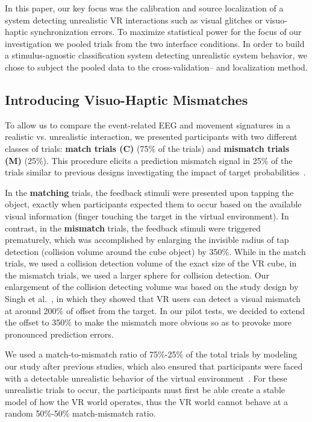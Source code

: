In this paper, our key focus was the calibration and source localization of a system detecting unrealistic VR interactions such as visual glitches or visuo-haptic synchronization errors. To maximize statistical power for the focus of our investigation we pooled trials from the two interface conditions. In order to build a stimulus-agnostic classification system detecting unrealistic system behavior, we chose to subject the pooled data to the cross-validation-- and localization method.

\subsection{Introducing Visuo-Haptic Mismatches}
To allow us to compare the event-related EEG and movement signatures in a realistic vs. unrealistic interaction, we presented participants with two different classes of trials: \textbf{match trials (C)} (75\% of the trials) and \textbf{mismatch trials (M)} (25\%). This procedure elicits a prediction mismatch signal in 25\% of the trials similar to previous designs investigating the impact of target probabilities~\cite{Polich2007-cf}.  %

In the \textbf{matching} trials, the feedback stimuli were presented upon tapping the object, exactly when participants expected them to occur based on the available visual information (finger touching the target in the virtual environment). In contrast, in the \textbf{mismatch} trials, the feedback stimuli were triggered prematurely, which was accomplished by enlarging the invisible radius of tap detection (collision volume around the cube object) by 350\%. While in the match trials, we used a collision detection volume of the exact size of the VR cube, in the mismatch trials, we used a larger sphere for collision detection. Our enlargement of the collision detecting volume was based on the study design by Singh et al.~\cite{Singh2018-qi}, in which they showed that VR users can detect a visual mismatch at around 200\% of offset from the target. In our pilot tests, we decided to extend the offset to 350\% to make the mismatch more obvious so as to provoke more pronounced prediction errors. 

We used a match-to-mismatch ratio of 75\%-25\% of the total trials by modeling our study after previous studies, which also ensured that participants were faced with a detectable unrealistic behavior of the virtual environment~\cite{Liao2011-po,Wiersema2007-jf,Donchin1988-gq}. For these unrealistic trials to occur, the participants must first be able create a stable model of how the VR world operates, thus the VR world cannot behave at a random 50\%-50\% match-mismatch ratio. 

